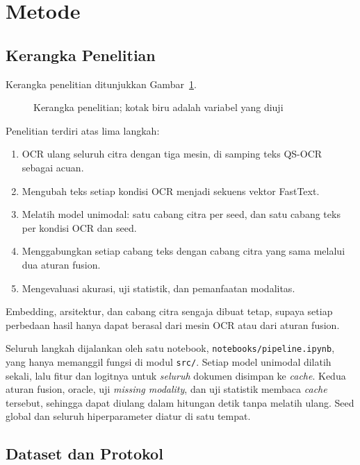\section{Metode}\label{sec:metode}

\subsection{Kerangka Penelitian}\label{sec:kerangka}

Kerangka penelitian ditunjukkan Gambar~\ref{fig:kerangka}.

\begin{figure}[H]
  \centering
  \resizebox{\textwidth}{!}{}
  \caption{Kerangka penelitian; kotak biru adalah variabel yang diuji}
  \label{fig:kerangka}
\end{figure}

Penelitian terdiri atas lima langkah:
\begin{enumerate}
  \item OCR ulang seluruh citra dengan tiga mesin, di samping teks QS-OCR sebagai acuan.
  \item Mengubah teks setiap kondisi OCR menjadi sekuens vektor FastText.
  \item Melatih model unimodal: satu cabang citra per seed, dan satu cabang teks per
  kondisi OCR dan seed.
  \item Menggabungkan setiap cabang teks dengan cabang citra yang sama melalui dua aturan
  fusion.
  \item Mengevaluasi akurasi, uji statistik, dan pemanfaatan modalitas.
\end{enumerate}
Embedding, arsitektur, dan cabang citra sengaja dibuat tetap, supaya setiap perbedaan
hasil hanya dapat berasal dari mesin OCR atau dari aturan fusion.

Seluruh langkah dijalankan oleh satu notebook, \texttt{notebooks/pipeline.ipynb}, yang
hanya memanggil fungsi di modul \texttt{src/}. Setiap model unimodal dilatih sekali, lalu
fitur dan logitnya untuk \emph{seluruh} dokumen disimpan ke \textit{cache}. Kedua aturan
fusion, oracle, uji \textit{missing modality}, dan uji statistik membaca \textit{cache}
tersebut, sehingga dapat diulang dalam hitungan detik tanpa melatih ulang. Seed global
dan seluruh hiperparameter diatur di satu tempat.

\subsection{Dataset dan Protokol}\label{sec:dataset}

